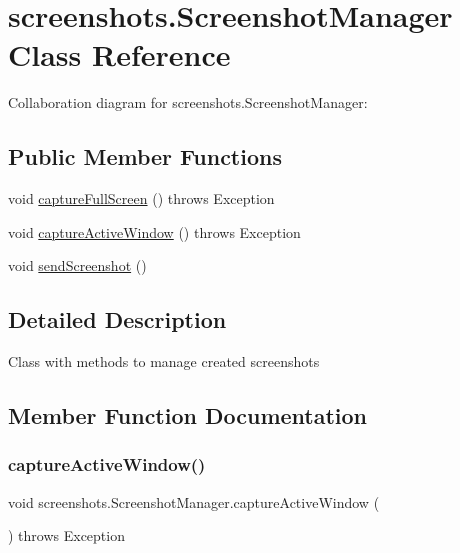 \hypertarget{classscreenshots_1_1_screenshot_manager}{}\section{screenshots.\+Screenshot\+Manager Class Reference}
\label{classscreenshots_1_1_screenshot_manager}


Collaboration diagram for screenshots.\+Screenshot\+Manager\+:
\subsection*{Public Member Functions}
\begin{DoxyCompactItemize}
\item 
void \hyperlink{classscreenshots_1_1_screenshot_manager_aed584aa559396b79c563fc1265db9d71}{capture\+Full\+Screen} ()  throws Exception
\item 
void \hyperlink{classscreenshots_1_1_screenshot_manager_a929b5dcdecaae5fbd167fba9a2935fcf}{capture\+Active\+Window} ()  throws Exception 
\item 
void \hyperlink{classscreenshots_1_1_screenshot_manager_ad0da7ac637dba41b46e45487dc92e87b}{send\+Screenshot} ()
\end{DoxyCompactItemize}


\subsection{Detailed Description}
Class with methods to manage created screenshots 

\subsection{Member Function Documentation}
\mbox{\label{classscreenshots_1_1_screenshot_manager_a929b5dcdecaae5fbd167fba9a2935fcf}} 
\subsubsection{\texorpdfstring{capture\+Active\+Window()}{captureActiveWindow()}}
{\footnotesize\ttfamily void screenshots.\+Screenshot\+Manager.\+capture\+Active\+Window (\begin{DoxyParamCaption}{ }\end{DoxyParamCaption}) throws Exception}

